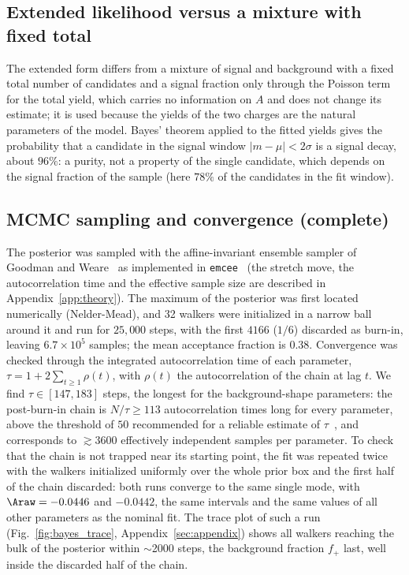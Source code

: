 \subsection{Extended likelihood versus a mixture with fixed total}
The extended form differs from a mixture of signal and background with a fixed total number of candidates and a signal fraction only through the Poisson term for the total yield, which carries no information on $A$ and does not change its estimate; it is used because the yields of the two charges are the natural parameters of the model. Bayes' theorem applied to the fitted yields gives the probability that a candidate in the signal window $|m-\mu|<2\sigma$ is a signal decay, about $96\%$: a purity, not a property of the single candidate, which depends on the signal fraction of the sample (here $78\%$ of the candidates in the fit window).

\subsection{MCMC sampling and convergence (complete)}
The posterior was sampled with the affine-invariant ensemble sampler of Goodman and Weare~\cite{goodman_weare} as implemented in \texttt{emcee}~\cite{emcee} (the stretch move, the autocorrelation time and the effective sample size are described in Appendix~\ref{app:theory}). The maximum of the posterior was first located numerically (Nelder-Mead), and 32 walkers were initialized in a narrow ball around it and run for $25{,}000$ steps, with the first $4166$ ($1/6$) discarded as burn-in, leaving $6.7\times10^5$ samples; the mean acceptance fraction is $0.38$. Convergence was checked through the integrated autocorrelation time of each parameter, $\tau=1+2\sum_{t\geq1}\rho(t)$, with $\rho(t)$ the autocorrelation of the chain at lag $t$. We find $\tau\in[147,183]$ steps, the longest for the background-shape parameters: the post-burn-in chain is $N/\tau\geq113$ autocorrelation times long for every parameter, above the threshold of $50$ recommended for a reliable estimate of $\tau$~\cite{emcee}, and corresponds to $\gtrsim3600$ effectively independent samples per parameter. To check that the chain is not trapped near its starting point, the fit was repeated twice with the walkers initialized uniformly over the whole prior box and the first half of the chain discarded: both runs converge to the same single mode, with $\Araw=-0.0446$ and $-0.0442$, the same intervals and the same values of all other parameters as the nominal fit. The trace plot of such a run (Fig.~\ref{fig:bayes_trace}, Appendix~\ref{sec:appendix}) shows all walkers reaching the bulk of the posterior within $\sim$2000 steps, the background fraction $f_+$ last, well inside the discarded half of the chain.

